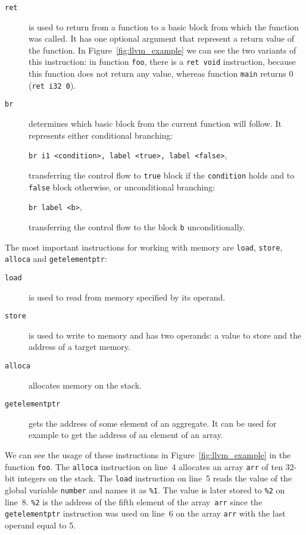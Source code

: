 \begin{description}
\item[\texttt{ret}] is used to return from a function to a basic block
from which the function was called. It has one optional argument that represent
a return value of the function. In Figure~\ref{fig:llvm_example} we can see the
two variants of this instruction: in function \texttt{foo}, there is a
\texttt{ret void} instruction, because this function does not return any value,
whereas function \texttt{main} returns 0 (\texttt{ret i32 0}).

\item[\texttt{br}] determines which basic block from the current function
will follow. It represents either conditional branching:

\texttt{br i1 <condition>, label <true>, label <false>},

transferring the control flow to \texttt{true} block if the \texttt{condition} holds and to
\texttt{false} block otherwise, or unconditional branching:

\texttt{br label <b>},

transferring the control flow to the block \texttt{b} unconditionally.
\end{description}

The most important instructions for working with memory are \texttt{load},
\texttt{store}, \texttt{alloca} and \texttt{getelementptr}:
\begin{description}
\item[\texttt{load}] is used to read from memory specified by its operand.
\item[\texttt{store}] is used to write to memory and has two operands: a value
to store and the address of a target memory.
\item[\texttt{alloca}] allocates memory on the stack.
\item[\texttt{getelementptr}] gets the address of some element of an aggregate.
It can be used for example to get the address of an element of an array.
\end{description}
We can see the usage of these instructions in Figure~\ref{fig:llvm_example} in
the function \texttt{foo}. The \texttt{alloca} instruction on line~4 allocates an
array \texttt{arr} of ten 32-bit integers on the stack. The \texttt{load}
instruction on line~5 reads the value of the global variable \texttt{number} and
names it as \texttt{\%1}. The value is later stored to \texttt{\%2} on line~8.
\texttt{\%2} is the address of the fifth element of the array~\texttt{arr} since the
\texttt{getelementptr} instruction was used on line~6 on the array \texttt{arr}
with the last operand equal to 5.


